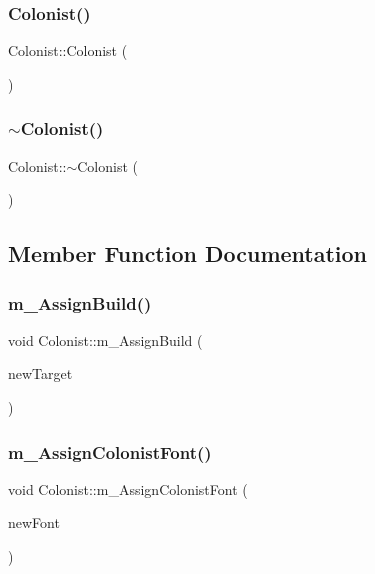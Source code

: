 \subsubsection{\texorpdfstring{Colonist()}{Colonist()}}
{\footnotesize\ttfamily Colonist\+::\+Colonist (\begin{DoxyParamCaption}{ }\end{DoxyParamCaption})}

\mbox{\label{class_colonist_a92d8c64b932a5eeeea9e873badb931cb}} 
\subsubsection{\texorpdfstring{$\sim$\+Colonist()}{~Colonist()}}
{\footnotesize\ttfamily Colonist\+::$\sim$\+Colonist (\begin{DoxyParamCaption}{ }\end{DoxyParamCaption})}



\subsection{Member Function Documentation}
\mbox{\label{class_colonist_a18c45b63f78136d73efcd67e92b06a73}} 
\subsubsection{\texorpdfstring{m\+\_\+\+Assign\+Build()}{m\_AssignBuild()}}
{\footnotesize\ttfamily void Colonist\+::m\+\_\+\+Assign\+Build (\begin{DoxyParamCaption}\item[{\mbox{\hyperlink{class_building_object}{Building\+Object}} $\ast$}]{new\+Target }\end{DoxyParamCaption})}

\mbox{\label{class_colonist_a946c12abecdd1aa6c9be662eff8856ae}} 
\subsubsection{\texorpdfstring{m\+\_\+\+Assign\+Colonist\+Font()}{m\_AssignColonistFont()}}
{\footnotesize\ttfamily void Colonist\+::m\+\_\+\+Assign\+Colonist\+Font (\begin{DoxyParamCaption}\item[{sf\+::\+Font \&}]{new\+Font }\end{DoxyParamCaption})}

